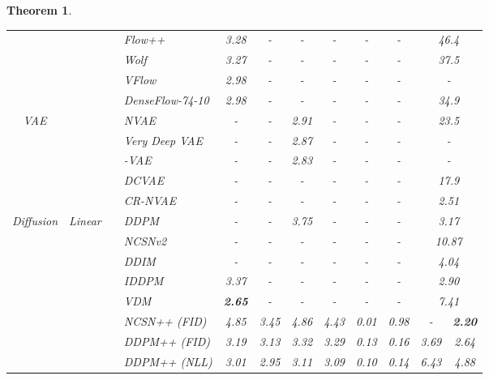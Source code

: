 \documentclass{article}
\newtheorem{theorem}{Theorem}\newtheorem{proposition}{Proposition}
\theoremstyle{definition}
\theoremstyle{remark}
\begin{document}
\begin{theorem}
\begin{table*}[t]
\begin{adjustbox}{max width=\textwidth}
\begin{tabular}{cccl|cccccccc}
				&  	&											& Flow++ \cite{ho2019flow++} & 3.28 & - & - & - & - & - &  \multicolumn{2}{c}{46.4}  \\
				&  	&											& Wolf \cite{ma2020decoupling}	 & 3.27 & - & - & - & - & - &  \multicolumn{2}{c}{37.5}  \\
				&  	&											& VFlow \cite{chen2020vflow}	 & 2.98 & - & - & - & - & - &  \multicolumn{2}{c}{-}  \\
				&  	&											& DenseFlow-74-10 \cite{grcic2021densely}	 & 2.98 & - & - & - & - & - &  \multicolumn{2}{c}{34.9}  \\	 \midrule
				\multirow{5}{*}{VAE}  &  	&											& NVAE \cite{vahdat2020nvae}	 & - & - & 2.91  & - & - & - &  \multicolumn{2}{c}{23.5}  \\
				&  	&											& Very Deep VAE \cite{child2020very}	 & - & - & 2.87 & - & - & - &  \multicolumn{2}{c}{-}  \\
				&  	&											& -VAE \cite{razavi2018preventing}	 & - & - & 2.83 & - & - & - &  \multicolumn{2}{c}{-}  \\
				&  	&											& DCVAE \cite{parmar2021dual}	 & - & - & - & - & - & - &  \multicolumn{2}{c}{17.9}  \\
				&  	&											& CR-NVAE \cite{sinha2021consistency} 	 & - & - & - & - & - & - &  \multicolumn{2}{c}{2.51}  \\	 \midrule
				\multirow{19}{*}[-1.5em]{Diffusion}  & \multirow{9}{*}{Linear} 	&						& DDPM \cite{ho2020denoising}	 & - & - & 3.75 & - & - & - &\multicolumn{2}{c}{3.17} \\	
				&						&											& NCSNv2 \cite{song2020improved}	& - & - & - & - & - & - &\multicolumn{2}{c}{10.87} \\	
				&						&											& DDIM \cite{song2020denoising}	 & - & - & - & - & - & - &\multicolumn{2}{c}{4.04} \\
				&						&											& IDDPM \cite{nichol2021improved}	 & 3.37 & - & - & - & - & - &\multicolumn{2}{c}{2.90} \\	
				&						&											& VDM \cite{kingma2021variational}	 & \textbf{2.65} & - & - & - & - & - &\multicolumn{2}{c}{7.41} \\	
				&						&											& NCSN++ (FID) \cite{song2020score}	 & 4.85 & 3.45 & 4.86 & 4.43 & 0.01 & 0.98 & - 		& \textbf{2.20} \\		
				& 						&											& DDPM++ (FID) \cite{song2020score}	 & 3.19 & 3.13 & 3.32 & 3.29 & 0.13 & 0.16 & 3.69 	& 2.64		 \\
				& 						&											& DDPM++ (NLL) \cite{song2021maximum}	 & 3.01 & 2.95 & 3.11 & 3.09 & 0.10 & 0.14 & 6.43 	& 4.88 		\\

\end{tabular}
\end{adjustbox}
\end{table*}
\end{theorem}
\end{document}
